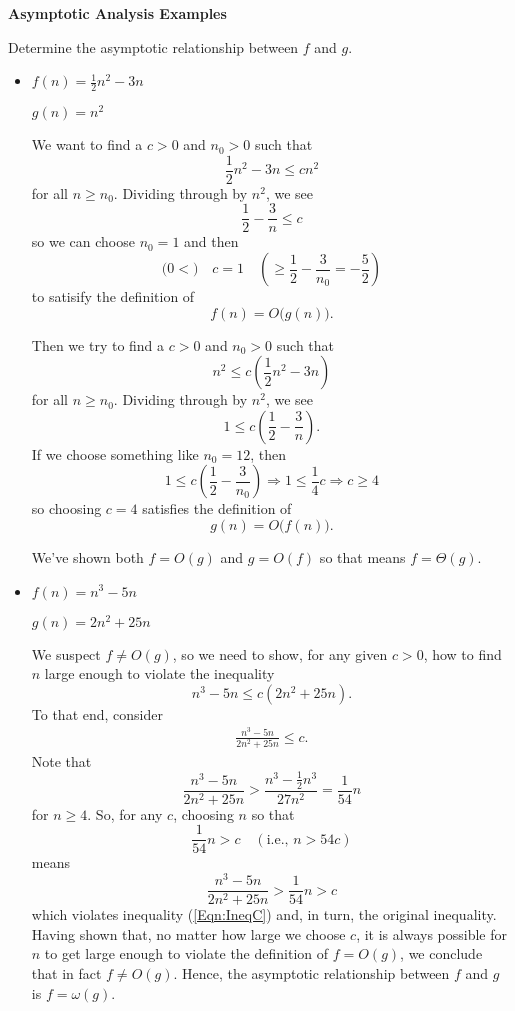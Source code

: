 \documentclass{article}
\begin{document}
{\Large\bf Asymptotic Analysis Examples}

\vspace{1pc}
Determine the asymptotic relationship between $f$ and $g$.

\begin{itemize}
\item
$f(n) = \frac{1}{2}n^2 - 3n$

$g(n) = n^2$

We want to find a $c>0$ and $n_0>0$ such that
\[
  \frac{1}{2}n^2 - 3n \le cn^2
\]
for all $n\ge n_0$.
Dividing through by $n^2$, we see
\[
  \frac{1}{2} - \frac{3}{n} \le c
\]
so we can choose $n_0=1$ and then
\[
  \Big(
  0 <
  \Big)
  \quad
  c = 1
  \quad
  \left(
  \ge
  \frac{1}{2} - \frac{3}{n_0}
  = -\frac{5}{2}
  \right)
\]
to satisify the definition of
\[
  f(n) = O\big(g(n)\big).
\]

Then we try to find a
$c>0$ and $n_0>0$ such that
\[
  n^2 \le c\left(\frac{1}{2}n^2 - 3n\right)
\]
for all $n\ge n_0$.
Dividing through by $n^2$, we see
\[
  1 \le c\left(\frac{1}{2} - \frac{3}{n}\right).
\]
If we choose something like $n_0=12$, then
\[
  1 \le c\left(\frac{1}{2} - \frac{3}{n_0}\right)
\Longrightarrow
  1 \le \frac{1}{4}c
\Longrightarrow
  c \ge 4
\]
so choosing $c=4$ satisfies the definition of
\[
  g(n) = O\big(f(n)\big).
\]

We've shown both
$f=O(g)$
and
$g=O(f)$
so that means
$f=\Theta(g)$.

\vspace{1pc}
\item
$f(n) = n^3 - 5n$

$g(n) = 2n^2 + 25n$

We suspect $f\ne O(g)$, so we need to show, for any given $c>0$, how to find $n$ large enough to violate the inequality
\[
   n^3 - 5n \le c\left(2n^2 + 25n\right).
\]
To that end, consider
\begin{eqnarray}
\label{Eqn:IneqC}
   \frac{n^3 - 5n}{2n^2 + 25n} \le c.
\end{eqnarray}
Note that
\[
   \frac{n^3 - 5n}{2n^2 + 25n} > \frac{n^3-\frac{1}{2}n^3}{27n^2} = \frac{1}{54}n
\]
for $n\ge4$.
So, for any $c$, choosing $n$ so that
\[
  \frac{1}{54}n > c \quad (\mbox{i.e., }n>54c)
\]
means
\[
  \frac{n^3 - 5n}{2n^2 + 25n} > \frac{1}{54}n > c
\]
which violates inequality (\ref{Eqn:IneqC}) and, in turn,
the original inequality.
Having shown that, no matter how large we choose $c$, it is always
possible for $n$ to get large enough to violate the definition
of $f=O(g)$, we conclude that in fact $f\ne O(g)$.
Hence, the asymptotic relationship between $f$ and $g$ is
$f=\omega(g)$.


\end{itemize}
\end{document}
